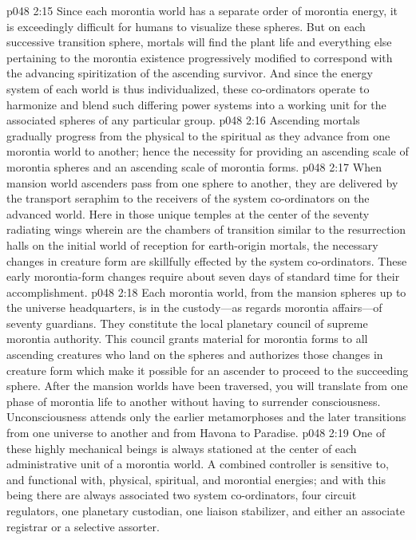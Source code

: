 \pc \vs p048 2:15 \bibnobreakspace {} Since each morontia world has a separate order of morontia energy, it is exceedingly difficult for humans to visualize these spheres. But on each successive transition sphere, mortals will find the plant life and everything else pertaining to the morontia existence progressively modified to correspond with the advancing spiritization of the ascending survivor. And since the energy system of each world is thus individualized, these co\hyp{}ordinators operate to harmonize and blend such differing power systems into a working unit for the associated spheres of any particular group.
\vs p048 2:16 Ascending mortals gradually progress from the physical to the spiritual as they advance from one morontia world to another; hence the necessity for providing an ascending scale of morontia spheres and an ascending scale of morontia forms.
\vs p048 2:17 When mansion world ascenders pass from one sphere to another, they are delivered by the transport seraphim to the receivers of the system co\hyp{}ordinators on the advanced world. Here in those unique temples at the center of the seventy radiating wings wherein are the chambers of transition similar to the resurrection halls on the initial world of reception for earth\hyp{}origin mortals, the necessary changes in creature form are skillfully effected by the system co\hyp{}ordinators. These early morontia\hyp{}form changes require about seven days of standard time for their accomplishment.
\pc \vs p048 2:18 \bibnobreakspace {} Each morontia world, from the mansion spheres up to the universe headquarters, is in the custody---as regards morontia affairs---of seventy guardians. They constitute the local planetary council of supreme morontia authority. This council grants material for morontia forms to all ascending creatures who land on the spheres and authorizes those changes in creature form which make it possible for an ascender to proceed to the succeeding sphere. After the mansion worlds have been traversed, you will translate from one phase of morontia life to another without having to surrender consciousness. Unconsciousness attends only the earlier metamorphoses and the later transitions from one universe to another and from Havona to Paradise.
\pc \vs p048 2:19 \bibnobreakspace {} One of these highly mechanical beings is always stationed at the center of each administrative unit of a morontia world. A combined controller is sensitive to, and functional with, physical, spiritual, and morontial energies; and with this being there are always associated two system co\hyp{}ordinators, four circuit regulators, one planetary custodian, one liaison stabilizer, and either an associate registrar or a selective assorter.
